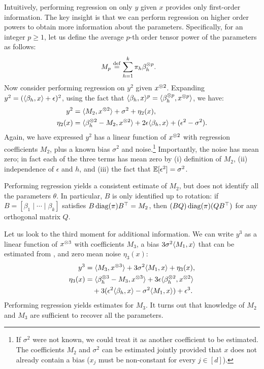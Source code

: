 Intuitively, performing regression on only $y$ given $x$ provides only first-order
information.  The key insight is that we can perform regression
on higher order powers to obtain more information about the parameters.
Specifically, for an integer $p \ge 1$, let us define the average
$p$-th order tensor power of the parameters as follows:
\begin{align}
M_p &\eqdef \sum_{h=1}^k \pi_h \beta_h\tp{p}. \label{eqn:Mp} %
\end{align}
Now consider performing regression on $y^2$ given $x^{\otimes 2}$.
Expanding $y^2 = (\langle \beta_h, x \rangle + \epsilon)^2$,
using the fact that $\langle \beta_h, x \rangle^p = \langle \beta_h^{\otimes p}, x^{\otimes p} \rangle$,
we have:
\begin{align}
y^2 &= \langle M_2, x^{\otimes 2} \rangle + \sigma^2 + \eta_2(x), \label{eqn:y2} \\
\eta_2(x) &= \langle \beta_h^{\otimes 2} - M_2, x^{\otimes 2} \rangle + 2 \epsilon \langle \beta_h, x \rangle + (\epsilon^2 - \sigma^2). \nonumber
\end{align}
Again, we have expressed $y^2$ has a linear function of $x^{\otimes 2}$
with regression coefficients $M_2$, plus a known bias $\sigma^2$ and noise.\footnote{If $\sigma^2$ were not known,
we could treat it as another coefficient
to be estimated.  The coefficients $M_2$ and $\sigma^2$ can be estimated jointly
provided that $x$ does not already contain a bias ($x_j$ must be non-constant for every $j \in [d]$).}
Importantly, the noise has mean zero; 
in fact each of the three terms has mean zero
by (i) definition of $M_2$, (ii) independence of $\epsilon$ and $h$,
and (iii) the fact that $\operatorname{\mathbb{E}}[\epsilon^2] = \sigma^2$.

Performing regression yields a consistent estimate of $M_2$,
but does not identify all the parameters $\theta$.
In particular, $B$ is only identified up to rotation:
if $B = [\beta_1 \mid \cdots \mid \beta_k]$ satisfies
$B \operatorname{diag}(\pi) B^\top = M_2$, then $(B Q) \operatorname{diag}(\pi) (Q B^\top)$
for any orthogonal matrix $Q$.

Let us look to the third moment for additional information.
We can write $y^3$ as a linear function of $x^{\otimes 3}$ with coefficients $M_3$,
a bias $3 \sigma^2 \langle M_1, x \rangle$ that can be estimated from , and zero mean noise $\eta_3(x)$:
\begin{align}
y^3 &= \langle M_3, x^{\otimes 3} \rangle + 3\sigma^2 \langle M_1, x \rangle + \eta_3(x), \label{eqn:y3} \\
\eta_3(x) &= \langle \beta_h^{\otimes 3} - M_3, x^{\otimes 3} \rangle
+ 3 \epsilon \langle \beta_h^{\otimes 2}, x^{\otimes 2} \rangle \nonumber \\
&\quad + 3(\epsilon^2 \langle \beta_h, x \rangle - \sigma^2 \langle M_1, x \rangle)
+ \epsilon^3. \nonumber
\end{align}
Performing regression yields estimates for $M_3$.
It turns out that knowledge of $M_2$ and $M_3$ are sufficient to recover
all the parameters.

